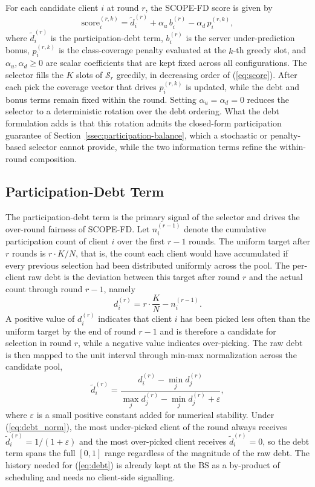 \documentclass[journal]{IEEEtran}
\begin{document}
For each candidate client $i$ at round $r$, the SCOPE-FD score is given by
\begin{equation}
\text{score}_i^{(r,k)} = \tilde{d}_i^{(r)} + \alpha_u\, b_i^{(r)} - \alpha_d\, p_i^{(r,k)},
\label{eq:score}
\end{equation}
where $\tilde{d}_i^{(r)}$ is the participation-debt term, $b_i^{(r)}$ is the server under-prediction bonus, $p_i^{(r,k)}$ is the class-coverage penalty evaluated at the $k$-th greedy slot, and $\alpha_u, \alpha_d \ge 0$ are scalar coefficients that are kept fixed across all configurations. The selector fills the $K$ slots of $\mathcal{S}_r$ greedily, in decreasing order of (\ref{eq:score}). After each pick the coverage vector that drives $p_i^{(r,k)}$ is updated, while the debt and bonus terms remain fixed within the round. Setting $\alpha_u = \alpha_d = 0$ reduces the selector to a deterministic rotation over the debt ordering. What the debt formulation adds is that this rotation admits the closed-form participation guarantee of Section~\ref{ssec:participation-balance}, which a stochastic or penalty-based selector cannot provide, while the two information terms refine the within-round composition.

\subsection{Participation-Debt Term}
\label{ssec:debt-term}

The participation-debt term is the primary signal of the selector and drives the over-round fairness of SCOPE-FD. Let $n_i^{(r-1)}$ denote the cumulative participation count of client $i$ over the first $r-1$ rounds. The uniform target after $r$ rounds is $r\cdot K/N$, that is, the count each client would have accumulated if every previous selection had been distributed uniformly across the pool. The per-client raw debt is the deviation between this target after round $r$ and the actual count through round $r-1$, namely
\begin{equation}
d_i^{(r)} = r\cdot \frac{K}{N} - n_i^{(r-1)}.
\label{eq:debt}
\end{equation}
A positive value of $d_i^{(r)}$ indicates that client $i$ has been picked less often than the uniform target by the end of round $r-1$ and is therefore a candidate for selection in round $r$, while a negative value indicates over-picking. The raw debt is then mapped to the unit interval through min-max normalization across the candidate pool,
\begin{equation}
\tilde{d}_i^{(r)} = \frac{d_i^{(r)} - \min_j d_j^{(r)}}{\max_j d_j^{(r)} - \min_j d_j^{(r)} + \varepsilon},
\label{eq:debt_norm}
\end{equation}
where $\varepsilon$ is a small positive constant added for numerical stability. Under (\ref{eq:debt_norm}), the most under-picked client of the round always receives $\tilde{d}_i^{(r)} = 1/(1+\varepsilon)$ and the most over-picked client receives $\tilde{d}_i^{(r)} = 0$, so the debt term spans the full $[0,1]$ range regardless of the magnitude of the raw debt. The history needed for (\ref{eq:debt}) is already kept at the BS as a by-product of scheduling and needs no client-side signalling.
\end{document}
